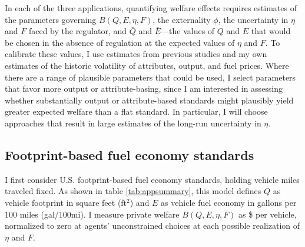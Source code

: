 \documentclass[12pt]{article}
\begin{document}
In each of the three applications, quantifying welfare effects requires estimates of the parameters governing $B(Q,E,\eta,F)$, the externality $\phi$, the uncertainty in $\eta$ and $F$ faced by the regulator, and $\bar{Q}$ and $\bar{E}$---the values of $Q$ and $E$ that would be chosen in the absence of regulation at the expected values of $\eta$ and $F$. To calibrate these values, I use estimates from previous studies and my own estimates of the historic volatility of attributes, output, and fuel prices. Where there are a range of plausible parameters that could be used, I select parameters that favor more output or attribute-basing, since I am interested in assessing whether substantially output or attribute-based standards might plausibly yield greater expected welfare than a flat standard. In particular, I will choose approaches that result in large estimates of the long-run uncertainty in $\eta$.


\subsection{Footprint-based fuel economy standards} \label{sec:footprint}
I first consider U.S. footprint-based fuel economy standards, holding vehicle miles traveled fixed. As shown in table \ref{tab:appsummary}, this model defines $Q$ as vehicle footprint in square feet (ft$^2$) and $E$ as vehicle fuel economy in gallons per 100 miles (gal/100mi). I measure private welfare $B(Q,E,\eta,F)$ as \$ per vehicle, normalized to zero at agents' unconstrained choices at each possible realization of $\eta$ and $F$.
\end{document}
